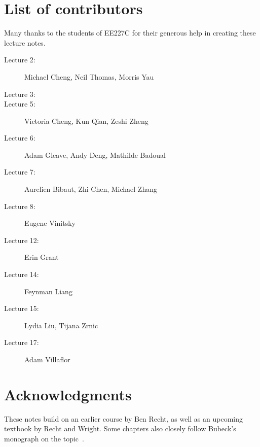 \section{List of contributors}

Many thanks to the students of EE227C for their generous help in creating these
lecture notes.

\begin{description}
\item[Lecture 2:] Michael Cheng, Neil Thomas, Morris Yau
\item[Lecture 3:]
\item[Lecture 5:] Victoria Cheng, Kun Qian, Zeshi Zheng
\item[Lecture 6:] Adam Gleave, Andy Deng, Mathilde Badoual
\item[Lecture 7:] Aurelien Bibaut, Zhi Chen, Michael Zhang
\item[Lecture 8:] Eugene Vinitsky
\item[Lecture 12:] Erin Grant
\item[Lecture 14:] Feynman Liang
\item[Lecture 15:] Lydia Liu, Tijana Zrnic
\item[Lecture 17:] Adam Villaflor
\end{description}

\section{Acknowledgments}

These notes build on an earlier course by Ben Recht, as well as an upcoming
textbook by Recht and Wright. Some chapters also closely follow Bubeck's
monograph on the topic~\cite{Bubeck}.
